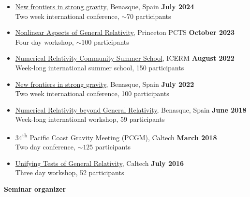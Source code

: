 \documentclass[margin,line]{res}
\begin{document}
\begin{resume}
\begin{itemize}
  {Simulating Extreme Spacetimes with SpEC and SpECTRE},
  ICERM \hfill {\bf August 2024} \\
\hspace*{1em} Week-long international workshop, $\sim$85 participants
\item[]
  \href{https://www.benasque.org/2024relativity/}
  {New frontiers in strong gravity},
  Benasque, Spain \hfill {\bf July 2024} \\
\hspace*{1em} Two week international conference, $\sim$70 participants
\item[]
  \href{https://pcts.princeton.edu/events/2023/nonlinear-aspects-general-relativity}
  {Nonlinear Aspects of General Relativity},
  Princeton PCTS \hfill {\bf October 2023}\\
\hspace*{1em} Four day workshop, $\sim$100 participants
\item[]
  \href{https://icerm.brown.edu/events/re-22-f20w1/}
  {Numerical Relativity Community Summer School},
  ICERM \hfill {\bf August 2022} \\
\hspace*{1em} Week-long international summer school, 150 participants
\item[]
  \href{https://www.benasque.org/2022relativity/}
  {New frontiers in strong gravity},
  Benasque, Spain \hfill {\bf July 2022} \\
\hspace*{1em} Two week international conference, 100 participants
\item[]
  \href{http://www.benasque.org/2018relativity/}
  {Numerical Relativity beyond General Relativity},
  Benasque, Spain \hfill {\bf June 2018} \\
\hspace*{1em} Week-long international workshop, 59 participants
\item[]
34\textsuperscript{th} Pacific Coast Gravity Meeting (PCGM),
Caltech
\hfill {\bf March 2018}\\
\hspace*{1em} Two day conference, $\sim 125$ participants
\item[]
  \href{http://www.tapir.caltech.edu/~unifying-gr-tests/}
  {Unifying Tests of General Relativity},
  Caltech \hfill {\bf July 2016} \\
\hspace*{1em} Three day workshop, 52 participants
\end{itemize}
\newpage{}
{\bf Seminar organizer}

\end{resume}
\end{document}
